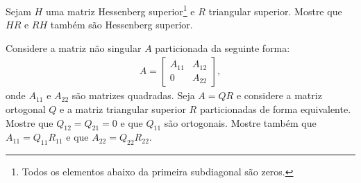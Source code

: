 \begin{questions}
    \question Sejam $H$ uma matriz Hessenberg superior\footnote{Todos os elementos abaixo da primeira subdiagonal s\~{a}o zeros.} e $R$ triangular superior. Mostre que $H R$ e $R H$ tamb\'{e}m s\~{a}o Hessenberg superior.
    \begin{solution}
    \end{solution}

    \question Considere a matriz n\~{a}o singular $A$ particionada da seguinte forma:
    \begin{align*}
        A = \begin{bmatrix}
            A_{11} & A_{12} \\
            0 & A_{22}
        \end{bmatrix},
    \end{align*}
    onde $A_{11}$ e $A_{22}$ s\~{a}o matrizes quadradas. Seja $A = Q R$ e considere a matriz ortogonal $Q$ e a matriz triangular superior $R$ particionadas de forma equivalente. Mostre que $Q_{12} = Q_{21} = 0$ e que $Q_{11}$ s\~{a}o ortogonais. Mostre tamb\'{e}m que $A_{11} = Q_{11} R_{11}$ e que $A_{22} = Q_{22} R_{22}$.
    \begin{solution}
    \end{solution}


\end{questions}
